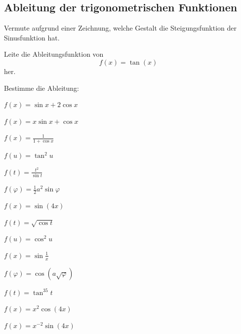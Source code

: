 \documentclass[%
11pt,%
twoside,%
titlepage,%
german,%
headsepline%
]{scrartcl}
\begin{document}
\subsection{Ableitung der trigonometrischen Funktionen}
\begin{ueb}[Trigoableitungen]
Vermute
aufgrund einer Zeichnung, welche Gestalt die Steigungsfunktion der Sinusfunktion hat.
\end{ueb}

\begin{ueb}
Leite
die Ableitungsfunktion von
$$f(x)=\tan(x)$$
her.
\end{ueb}

\clearpage

\begin{ueb}
Bestimme die Ableitung:

\begin{minipage}{0.4\textwidth}
\begin{enumeratea}
\item $f(x)=\sin x+2\cos x$
\item $f(x)=x\sin x+\cos x$
\item $f(x)=\frac{1}{1+\cos x}$
\item $f(u)=\tan^2u$
\item $f(t)=\frac{t^2}{\sin t}$
\item $f(\varphi)=\frac{1}{2}a^2\sin\varphi$
\item $f(x)=\sin(4x)$
\end{enumeratea}
\end{minipage}
\begin{minipage}{3.9cm}
\begin{enumeratea}
\addtocounter{enumi}{7}
\item $f(t)=\sqrt{\cos t}$
\item $f(u)=\cos^2u$
\item $f(x)=\sin\frac{1}{x}$
\item $f(\varphi)=\cos (a\sqrt{\varphi})$
\item $f(t)=\tan^35t$
\item $f(x)=x^2\cos(4x)$
\item $f(x)=x^{-2}\sin(4x)$
\end{enumeratea}
\end{minipage}
\end{ueb}
\end{document}
